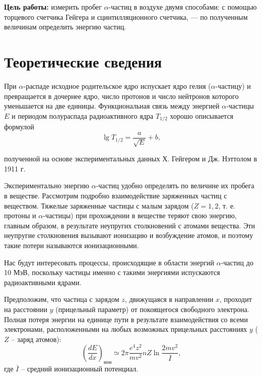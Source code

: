 
\newcommand{\tocsection}[1]{\section*{#1} \addcontentsline{toc}{section}{#1}}
\newcommand{\tocsubsection}[1]{\subsection*{#1} \addcontentsline{toc}{subsection}{#1}}
\renewcommand{\cftsecleader}{\cftdotfill{\cftdotsep}}


	
	\newpage
	
	\tableofcontents
	
	
	
	\newpage
	\textbf{Цель работы:} измерить пробег $\alpha$-частиц в воздухе двумя способами: с помощью торцевого счетчика Гейгера и сцинтилляционного счетчика, — по полученным величинам определить энергию частиц.
	
	\tocsection{Теоретические сведения}

	
	При $\alpha$-распаде исходное родительское ядро испускает ядро гелия ($\alpha$-частицу) и превращается в дочернее ядро, число протонов и число нейтронов которого уменьшается на две единицы.  Функциональная связь между энергией $\alpha$-частицы $E$ и периодом полураспада радиоактивного ядра $T_{1/2}$ хорошо описывается формулой
	\begin{equation}
		\lg T_{1/2} = \frac{a}{\sqrt{E}} + b,
	\end{equation}

	\noindent полученной на основе экспериментальных данных Х. Гейгером и Дж. Нэттолом в 1911 г.
		
	Экспериментально энергию $\alpha$-частиц удобно определять по величине их пробега в веществе. Рассмотрим подробно взаимодействие заряженных частиц с веществом. Тяжелые заряженные частицы с малым зарядом ($Z = 1, 2$, т. е. протоны и $\alpha$-частицы) при прохождении в веществе теряют свою энергию, главным образом, в результате неупругих столкновений с атомами вещества. Эти неупругие столкновения вызывают ионизацию и возбуждение атомов, и поэтому такие потери называются ионизационными.
	
	Нас будут интересовать процессы, происходящие в области энергий $\alpha$-частиц до 10 МэВ, поскольку частицы именно с такими энергиями испускаются радиоактивными ядрами.
	
	Предположим, что частица с зарядом $z$, движущаяся в направлении $x$, проходит на расстоянии $y$ (прицельный параметр) от покоящегося свободного электрона. Полная потеря энергии на единице пути в результате взаимодействия со всеми электронами, расположенными на любых возможных прицельных расстояниях $y$ ($Z$ -- заряд атомов):
	\begin{equation}
		\left(\frac{dE}{dx}\right)_\text{ион} \simeq 2\pi\frac{e^4 z^2}{mv^2}nZ\ln\frac{2mv^2}{\overline{I}},
		\label{AlphaParticles_FreeRun}
	\end{equation}
	\noindent где $\overline{I}$ -- средний ионизационный потенциал.


